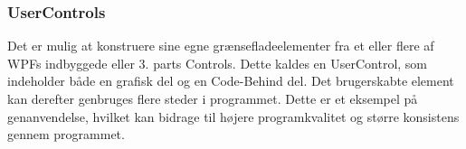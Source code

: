 \subsubsection*{UserControls}
Det er mulig at konstruere sine egne grænsefladeelementer fra et eller flere af WPFs indbyggede eller 3. parts Controls.
Dette kaldes en UserControl, som indeholder både en grafisk del og en Code-Behind del.
Det brugerskabte element kan derefter genbruges flere steder i programmet.
Dette er et eksempel på genanvendelse, hvilket kan bidrage til højere programkvalitet og større konsistens gennem programmet. 
